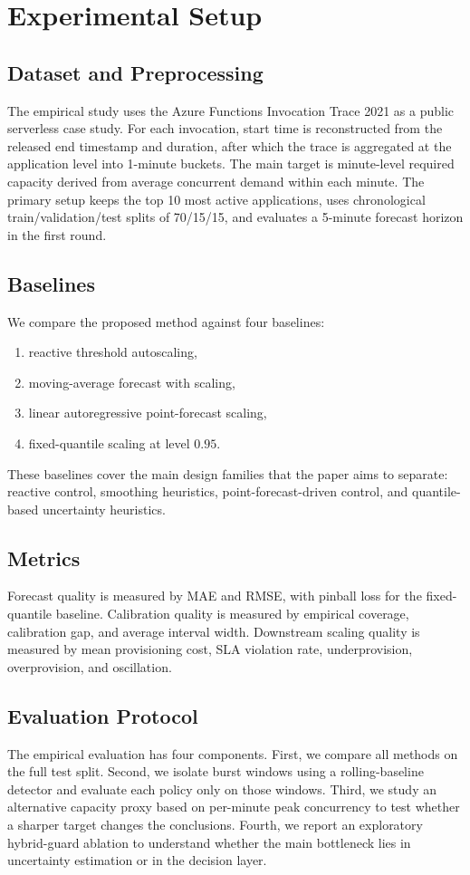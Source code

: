 \documentclass[11pt]{article}
\theoremstyle{plain}
\theoremstyle{definition}
\theoremstyle{remark}
\begin{document}
\section{Experimental Setup}
\subsection{Dataset and Preprocessing}
The empirical study uses the Azure Functions Invocation Trace 2021 as a public serverless case study. For each invocation, start time is reconstructed from the released end timestamp and duration, after which the trace is aggregated at the application level into 1-minute buckets. The main target is minute-level required capacity derived from average concurrent demand within each minute. The primary setup keeps the top 10 most active applications, uses chronological train/validation/test splits of 70/15/15, and evaluates a 5-minute forecast horizon in the first round.

\subsection{Baselines}
We compare the proposed method against four baselines:
\begin{enumerate}[leftmargin=1.2cm]
    \item reactive threshold autoscaling,
    \item moving-average forecast with scaling,
    \item linear autoregressive point-forecast scaling,
    \item fixed-quantile scaling at level $0.95$.
\end{enumerate}
These baselines cover the main design families that the paper aims to separate: reactive control, smoothing heuristics, point-forecast-driven control, and quantile-based uncertainty heuristics.

\subsection{Metrics}
Forecast quality is measured by MAE and RMSE, with pinball loss for the fixed-quantile baseline. Calibration quality is measured by empirical coverage, calibration gap, and average interval width. Downstream scaling quality is measured by mean provisioning cost, SLA violation rate, underprovision, overprovision, and oscillation.

\subsection{Evaluation Protocol}
The empirical evaluation has four components. First, we compare all methods on the full test split. Second, we isolate burst windows using a rolling-baseline detector and evaluate each policy only on those windows. Third, we study an alternative capacity proxy based on per-minute peak concurrency to test whether a sharper target changes the conclusions. Fourth, we report an exploratory hybrid-guard ablation to understand whether the main bottleneck lies in uncertainty estimation or in the decision layer.
\end{document}
